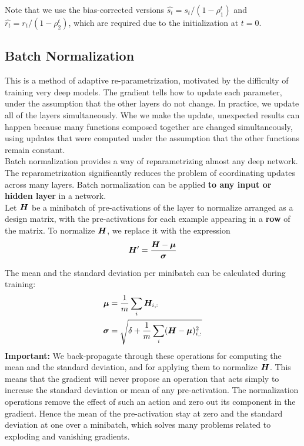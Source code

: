 \begin{multicols}{2}
		Note that we use the bias-corrected versions $ \hat{s_{t}} = s_{t} / (1 - \rho_{1}^{t}) $ and $ \hat{r_{t}} = r_{t} / (1 - \rho_{2}^{t}) $, which are required due
		to the initialization at $ t = 0 $.
	
	\subsection{Batch Normalization}
	This is a method of adaptive re-parametrization, motivated by the difficulty of training very deep models.
	The gradient tells how to update each parameter, under the assumption that the other layers do not change.
	In practice, we update all of the layers simultaneously.
	Whe we make the update, unexpected results can happen because many functions composed together are changed simultaneously, using updates that were computed under the assumption that the other functions remain constant.\\
	
	Batch normalization provides a way of reparametrizing almost any deep network.
	The reparametrization significantly reduces the problem of coordinating updates across many layers.
	Batch normalization can be applied \textbf{to any input or hidden layer} in a network.\\
	
	Let ${\bm{H}}$ be a minibatch of pre-activations of the layer to normalize arranged as a design matrix, with the pre-activations for each example appearing in a \textbf{row} of the matrix.
	To normalize ${\bm{H}}$, we replace it with the expression
	\[ \mH'=\frac{\mH - \vmu}{\bol{\sigma}} \]
	
	The mean and the standard deviation per minibatch can be calculated during training:
	\begin{align*}
	\vmu &= \frac{1}{m}\sum_i\mH_{i,:}\\
	\bol{\sigma} &= \sqrt{\delta+\frac{1}{m}\sum_i (\mH-\vmu)_{i,:}^2}
	\end{align*}
	\textbf{Important:}
	We back-propagate through these operations for computing the mean and the standard deviation, and for applying them to normalize ${\bm{H}}$. This means that the gradient will never propose an operation that acts simply to increase the standard deviation or mean of any pre-activation. The normalization operations remove the effect of such an action and zero out its component in the gradient. Hence the mean of the pre-activation stay at zero and the standard deviation at one over a minibatch, which solves many problems related to exploding and vanishing gradients.
	

\end{multicols}
